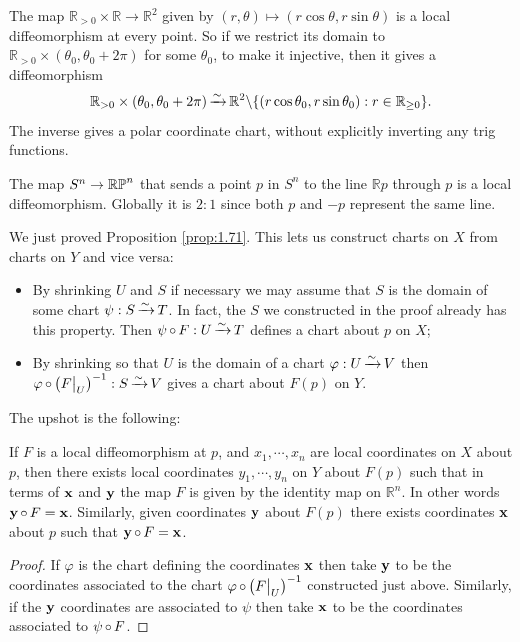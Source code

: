 \documentclass[a4paper,11pt]{article}
\begin{document}
	\begin{ex}
		The map $\mathbb{R}_{>0} \times \mathbb{R} \to \mathbb{R}^2$ given by $(r,\theta)\mapsto (r \cos \theta, r \sin \theta)$ is a local diffeomorphism at every point. So if we restrict its domain to $\mathbb{R}_{>0} \times (\theta_0 ,\theta_0 + 2 \pi)$ for some $\theta_0$, to make it injective, then it gives a diffeomorphism
		\[
			\mathbb{R}_{>0} \times (\theta_0 ,\theta_0 + 2 \pi) \operatorname{\xrightarrow{\sim}} \mathbb{R}^2 \backslash \{(r \cos \theta_0 , r \sin \theta_0): r \in \mathbb{R}_{\geq 0}\}.
		\]
		The inverse gives a polar coordinate chart, without explicitly inverting any trig functions.
	\end{ex}

	\begin{ex}
		The map $S^n \to \mathbb{RP}^{n}$ that sends a point $p$ in $S^n$ to the line $\mathbb{R} p $ through $p$ is a local diffeomorphism. Globally it is $2 : 1$ since both $p$ and $-p$ represent the same line.
	\end{ex}

	We just proved Proposition \ref{prop:1.71}. This lets us construct charts on $X$ from charts on $Y$ and vice versa:
	\begin{itemize}
		\item By shrinking $U$ and $S$ if necessary we may assume that $S$ is the domain of some chart $\psi : S \operatorname{\xrightarrow{\sim}} T$. In fact, the $S$ we constructed in the proof already has this property. Then $\psi \operatorname{\circ} F : U \operatorname{\xrightarrow{\sim}} T$ defines a chart about $p$ on $X$;
		\item By shrinking so that $U$ is the domain of a chart $\varphi: U \operatorname{\xrightarrow{\sim}} V$ then $\varphi \operatorname{\circ} \left( F\big|_U \right)^{-1} : S \operatorname{\xrightarrow{\sim}} V$ gives a chart about $F(p)$ on $Y$. 
	\end{itemize}

	The upshot is the following:

	\begin{lem}
		If $F$ is a local diffeomorphism at $p$, and $x_1, \cdots, x_n$ are local coordinates on $X$ about $p$, then there exists local coordinates $y_1, \cdots, y_n$ on $Y$ about $F(p)$ such that in terms of $\vb x$ and $\vb y$ the map $F$ is given by the identity map on $\mathbb{R}^n$. In other words $\vb y \operatorname{\circ} F = \vb x$. Similarly, given coordinates $\vb y$ about $F(p)$ there exists coordinates $\vb x$ about $p$ such that $\vb y \operatorname{\circ} F = \vb x$.
	\end{lem}
	\begin{proof}
		If $\varphi$ is the chart defining the coordinates $\vb x$ then take $\vb y$ to be the coordinates associated to the chart $\varphi \operatorname{\circ} \left( F \big|_U \right)^{-1}$ constructed just above. Similarly, if the $\vb y$ coordinates are associated to $\psi$ then take $\vb x$ to be the coordinates associated to $\psi \operatorname{\circ} F$. 
	\end{proof}
\end{document}
